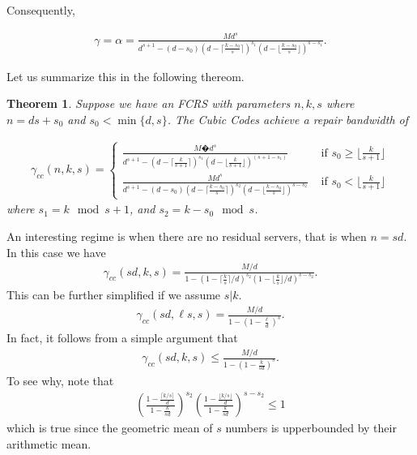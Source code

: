 \documentclass[journal,onecolumn,draftcls]{IEEEtran}
\newtheorem{theorem}{Theorem}
\begin{document}
\begin{itemize}
Consequently,

\begin{eqnarray*}
\gamma = \alpha = \frac{{M}d^s}{d^{s+1} -  (d-s_0)(d - \lceil{\frac{k-s_0}{s}}\rceil)^{s_1}(d - \lfloor{\frac{k-s_0}{s}}\rfloor)^{s-s_1}}.
\end{eqnarray*}

Let us summarize this in the following thereom.
\end{itemize}
\begin{theorem}
Suppose we have an FCRS with parameters $n,k,s$ where $n = ds + s_0$ and $s_0 < \min\{d,s\}$. The Cubic Codes achieve a repair bandwidth of

\begin{eqnarray}
\gamma_{cc}(n,k,s) =
\begin{cases}
\frac{{M}�d^{s}}{ d^{s+1} -  (d - \lceil{\frac{k}{s+1}}\rceil)^{s_1} (d - \lfloor{\frac{k}{s+1}}\rfloor)^{(s +1- s_1)}} & \mbox{ if } s_0 \ge  \lfloor{\frac{k}{s +1}}\rfloor\\
\frac{{M}d^s}{d^{s+1} -  (d-s_0)(d - \lceil{\frac{k-s_0}{s}}\rceil)^{s_2}(d - \lfloor{\frac{k-s_0}{s}}\rfloor)^{s-s_2}} & \mbox{ if } s_0 <  \lfloor{\frac{k}{s +1}}\rfloor
\end{cases}
\label{eqn:gammacc}
\end{eqnarray}
where $s_1 = k \mod s+1$, and $s_2 = k-s_0 \mod s$.
\end{theorem} %
An interesting regime is when there are no residual servers, that is when $n = sd$. In this case we have
\begin{eqnarray}
\gamma_{cc}(sd,k,s) =
\frac{{M}/d}{1-(1 - \lceil{\frac{k}{s}}\rceil/d)^{s_2}(1 - \lfloor{\frac{k}{s}}\rfloor/d)^{s-s_2}}.
\label{eqn:comelater}
\end{eqnarray}
This can be further simplified if we assume $s|k$.
\begin{eqnarray*}
\gamma_{cc}(sd,\ell s, s) =
\frac{{M}/d}{1-(1 -\frac{\ell}{d})^{s}}.
 \end{eqnarray*}
 In fact, it follows from a simple argument that
 \begin{eqnarray}
\gamma_{cc}(sd,k,s) \le \frac{{M}/d}{1-(1 -\frac{k}{sd})^{s}}.
\label{eqn:someapprox}
 \end{eqnarray}
 To see why, note that 
  \begin{eqnarray*}
 \left( \frac{1- \frac{\lceil k/s\rceil}{d}}{1- \frac{k}{sd}}\right)^{s_2} \left( \frac{1- \frac{\lfloor k/s\rfloor}{d}}{1- \frac{k}{sd}}\right)^{s - s_2}\le 1
  \end{eqnarray*} 
which is true since the geometric mean of $s$ numbers is upperbounded by their arithmetic mean.\\
\end{document}
